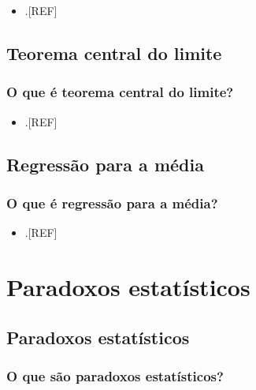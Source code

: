 \documentclass[
]{book}
\providecommand{\tightlist}{%
  \setlength{\itemsep}{0pt}\setlength{\parskip}{0pt}}
\begin{document}
\begin{itemize}
\tightlist
\item
  .{[}REF{]}
\end{itemize}

\hypertarget{teorema-central-limite}{%
\section{Teorema central do limite}\label{teorema-central-limite}}

\hypertarget{o-que-uxe9-teorema-central-do-limite}{%
\subsection{O que é teorema central do limite?}\label{o-que-uxe9-teorema-central-do-limite}}

\begin{itemize}
\tightlist
\item
  .{[}REF{]}
\end{itemize}

\hypertarget{regressao-media}{%
\section{Regressão para a média}\label{regressao-media}}

\hypertarget{o-que-uxe9-regressuxe3o-para-a-muxe9dia}{%
\subsection{O que é regressão para a média?}\label{o-que-uxe9-regressuxe3o-para-a-muxe9dia}}

\begin{itemize}
\tightlist
\item
  .{[}REF{]}
\end{itemize}

\hypertarget{paradoxos-estatisticos}{%
\chapter{\texorpdfstring{\textbf{Paradoxos estatísticos}}{Paradoxos estatísticos}}\label{paradoxos-estatisticos}}

\hypertarget{paradoxos}{%
\section{Paradoxos estatísticos}\label{paradoxos}}

\hypertarget{o-que-suxe3o-paradoxos-estatuxedsticos}{%
\subsection{O que são paradoxos estatísticos?}\label{o-que-suxe3o-paradoxos-estatuxedsticos}}
\end{document}
